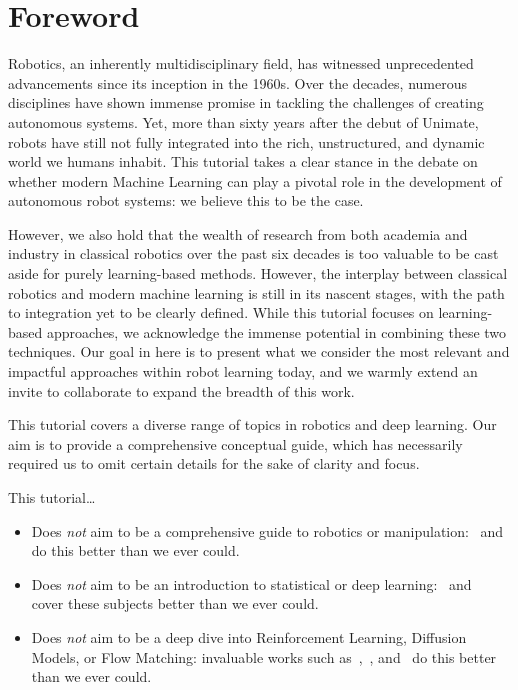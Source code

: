\section*{Foreword}

Robotics, an inherently multidisciplinary field, has witnessed unprecedented advancements since its inception in the 1960s. 
Over the decades, numerous disciplines have shown immense promise in tackling the challenges of creating autonomous systems. 
Yet, more than sixty years after the debut of Unimate, robots have still not fully integrated into the rich, unstructured, and dynamic world we humans inhabit.
This tutorial takes a clear stance in the debate on whether modern Machine 
Learning can play a pivotal role in the development of 
autonomous robot systems: we believe this to be the case.

However, we also hold that the wealth of research from both academia and industry in classical robotics over the past six decades is too valuable to be cast aside for purely learning-based methods. 
However, the interplay between classical robotics and modern machine learning is still in its nascent stages, with the path to integration yet to be clearly defined. 
While this tutorial focuses on learning-based approaches, we acknowledge the immense potential in combining these two techniques. 
Our goal in here is to present what we consider the most relevant and impactful approaches within robot learning today, and we warmly extend an invite to collaborate to expand the breadth of this work.

This tutorial covers a diverse range of topics in robotics and deep learning. Our aim is to provide a comprehensive conceptual guide, which has necessarily required us to omit certain details for the sake of clarity and focus.

This tutorial\dots
\begin{itemize}
    \item Does \emph{not} aim to be a comprehensive guide to robotics or manipulation:~\citet{sicilianoSpringerHandbookRobotics2016} and~\citet{tedrakeRoboticManipulationPerception} do this better than we ever could.
    \item Does \emph{not} aim to be an introduction to statistical or deep learning:~\citet{shalev-shwartzUnderstandingMachineLearning2014} and~\citet{prince2023understanding} cover these subjects better than we ever could.
    \item Does \emph{not} aim to be a deep dive into Reinforcement Learning, Diffusion Models, or Flow Matching: invaluable works such as~\citet{suttonReinforcementLearningIntroduction2018},~\citet{nakkiranStepbyStepDiffusionElementary2024}, and~\citet{lipmanFlowMatchingGuide2024} do this better than we ever could.
\end{itemize}

